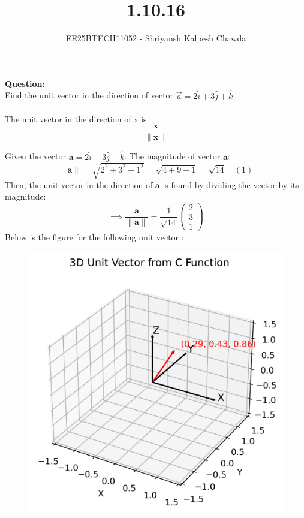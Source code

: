 \documentclass[journal]{IEEEtran}
\begin{document}
	
	
	\vspace{3cm}
	
	\title{1.10.16}
	\author{EE25BTECH11052 - Shriyansh Kalpesh Chawda}
	
	{\let\newpage\relax\maketitle}
	
	\renewcommand{\thefigure}{\theenumi}
	\renewcommand{\thetable}{\theenumi}
	\setlength{\intextsep}{10pt} 
	
	\renewcommand{\thetable}{\theenumi}
	\textbf{Question}:\\
	Find the unit vector in the direction of vector $\vec{a} = 2\hat{i} + 3\hat{j} + \hat{k}$.
	\\
	\solution\\
	The unit vector in the direction of x is
	\begin{equation}
		\frac{\mathbf{x}}{\|\mathbf{x}\|} \tag{1.1.8.1}
	\end{equation}
	
Given the vector $\mathbf{a} = 2\hat{i} + 3 \hat{j} + \hat{k}$.
The magnitude of vector $\mathbf{a}$:$$ \|\mathbf{a}\| = \sqrt{2^2 + 3^2 + 1^2} = \sqrt{4+9+1} = \sqrt{14} \quad (1)$$Then, the unit vector in the direction of $\mathbf{a}$ is found by dividing the vector by its magnitude:$$\implies \frac{\mathbf{a}}{\|\mathbf{a}\|} = \frac{1}{\sqrt{14}} \begin{pmatrix} 
	2 \\ 
	3 \\ 
	1 
	\end{pmatrix} 
$$
Below is the figure for the following unit vector :
\\
\begin{figure}
	\centering
	\includegraphics[width=0.52\linewidth]{figs/unit_vector3d}
	\caption{}
	\label{fig:unitvector3d}
\end{figure}
	

	
	
\end{document}
